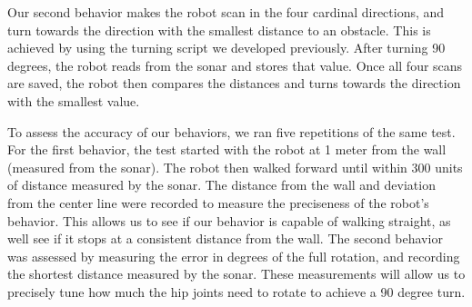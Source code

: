 \documentclass[11pt]{article}
\begin{document}
Our second behavior makes the robot scan in the four cardinal directions, and turn towards the direction with the smallest distance to an obstacle. This is achieved by using the turning script we developed previously. After turning 90 degrees, the robot reads from the sonar and stores that value. Once all four scans are saved, the robot then compares the distances and turns towards the direction with the smallest value.


To assess the accuracy of our behaviors, we ran five repetitions of the same test. For the first behavior, the test started with the robot at 1 meter from the wall (measured from the sonar). The robot then walked forward until within 300 units of distance measured by the sonar. The distance from the wall and deviation from the center line were recorded to measure the preciseness of the robot's behavior. This allows us to see if our behavior is capable of walking straight, as well see if it stops at a consistent distance from the wall.
The second behavior was assessed by measuring the error in degrees of the full rotation, and recording the shortest distance measured by the sonar. These measurements will allow us to precisely tune how much the hip joints need to rotate to achieve a 90 degree turn.

\end{document}
